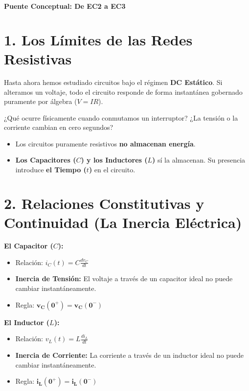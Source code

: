 \documentclass[11pt, a4paper]{article}
\begin{document}
\begin{tcolorbox}[colback=ucbblue!5!white, colframe=ucbblue, title=\textbf{Transición de Estado Estacionario a Régimen Transitorio}]
    \centering \textbf{Puente Conceptual: De EC2 a EC3}
\end{tcolorbox}

\section*{1. Los Límites de las Redes Resistivas}
Hasta ahora hemos estudiado circuitos bajo el régimen \textbf{DC Estático}. Si alteramos un voltaje, todo el circuito responde de forma instantánea gobernado puramente por álgebra ($V = IR$).

¿Qué ocurre físicamente cuando conmutamos un interruptor? ¿La tensión o la corriente cambian en cero segundos?
\begin{itemize}
    \item Los circuitos puramente resistivos \textbf{no almacenan energía}.
    \item \textbf{Los Capacitores ($C$) y los Inductores ($L$)} sí la almacenan. Su presencia introduce \textbf{el Tiempo ($t$)} en el circuito.
\end{itemize}

\section*{2. Relaciones Constitutivas y Continuidad (La Inercia Eléctrica)}

\vspace{0.2cm}
\noindent
\begin{minipage}[t]{0.48\textwidth}
    \textbf{\textcolor{ucbblue}{El Capacitor ($C$):}}
    \begin{itemize}
        \item Relación: $i_C(t) = C \frac{dv_C}{dt}$
        \item \textbf{Inercia de Tensión:} El voltaje a través de un capacitor ideal no puede cambiar instantáneamente.
        \item Regla: $\mathbf{v_C(0^+) = v_C(0^-)}$
    \end{itemize}
\end{minipage}
\hfill
\begin{minipage}[t]{0.48\textwidth}
    \textbf{\textcolor{ucbblue}{El Inductor ($L$):}}
    \begin{itemize}
        \item Relación: $v_L(t) = L \frac{di_L}{dt}$
        \item \textbf{Inercia de Corriente:} La corriente a través de un inductor ideal no puede cambiar instantáneamente.
        \item Regla: $\mathbf{i_L(0^+) = i_L(0^-)}$
    \end{itemize}
\end{minipage}
\end{document}

